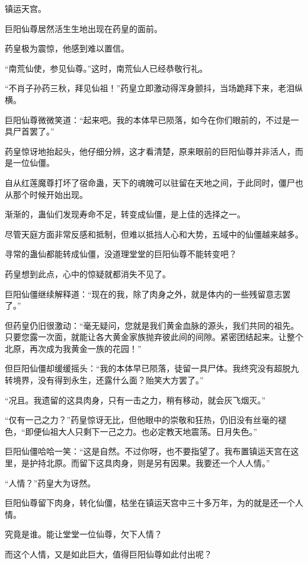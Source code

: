 
\begin{this_body}

镇运天宫。

巨阳仙尊居然活生生地出现在药皇的面前。

药皇极为震惊，他感到难以置信。

“南荒仙使，参见仙尊。”这时，南荒仙人已经恭敬行礼。

“不肖子孙药三秋，拜见仙祖！”药皇立即激动得浑身颤抖，当场跪拜下来，老泪纵横。

巨阳仙尊微微笑道：“起来吧。我的本体早已陨落，如今在你们眼前的，不过是一具尸首罢了。”

药皇惊讶地抬起头，他仔细分辨，这才看清楚，原来眼前的巨阳仙尊并非活人，而是一位仙僵。

自从红莲魔尊打坏了宿命蛊，天下的魂魄可以驻留在天地之间，于此同时，僵尸也从那个时候开始出现。

渐渐的，蛊仙们发现寿命不足，转变成仙僵，是上佳的选择之一。

尽管天庭方面非常反感和抵制，但难以抵挡人心和大势，五域中的仙僵越来越多。

寻常的蛊仙都能转成仙僵，没道理堂堂的巨阳仙尊不能转变吧？

药皇想到此点，心中的惊疑就都消失不见了。

巨阳仙僵继续解释道：“现在的我，除了肉身之外，就是体内的一些残留意志罢了。”

但药皇仍旧很激动：“毫无疑问，您就是我们黄金血脉的源头，我们共同的祖先。只要您露一次面，就能让各大黄金家族抛弃彼此间的间隙。紧密团结起来。让整个北原，再次成为我黄金一族的花园！”

但巨阳仙僵却缓缓摇头：“我的本体早已陨落，徒留一具尸体。我终究没有超脱九转境界，没有得到永生，还露什么面？贻笑大方罢了。”

“况且。我遗留的这具肉身，只有一击之力，稍有移动，就会灰飞烟灭。”

“仅有一己之力？”药皇惊讶无比，但他眼中的崇敬和狂热，仍旧没有丝毫的褪色，“即便仙祖大人只剩下一己之力。也必定教天地震荡。日月失色。”

巨阳仙僵哈哈一笑：“这是自然。不过你呀，也不要指望了。我布置镇运天宫在这里，是护持北原。而留下这具肉身，则是另有因果。我要还一个人人情。”

“人情？”药皇大为讶然。

巨阳仙尊留下肉身，转化仙僵，枯坐在镇运天宫中三十多万年，为的就是还一个人情。

究竟是谁。能让堂堂一位仙尊，欠下人情？

而这个人情，又是如此巨大，值得巨阳仙尊如此付出呢？


\end{this_body}

